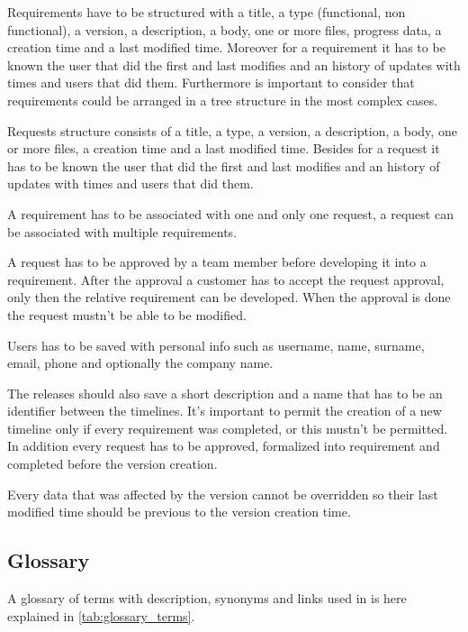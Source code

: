 \documentclass[12pt, a4paper]{report}
\begin{document}
Requirements have to be structured with a title, a type (functional, non functional), a version, a description, a body, one or
more files, progress data, a creation time and a last modified time. Moreover for a requirement it has to be known
the user that did the first and last modifies and an history of updates with times and users that did them. Furthermore is
important to consider that requirements could be arranged in a tree structure in the most complex cases.

Requests structure consists of a title, a type, a version, a description, a body, one or more files, a creation time and a last
modified time. Besides for a request it has to be known the user that did the first and last modifies and an history of
updates with times and users that did them.

A requirement has to be associated with one and only one request, a request can be associated with multiple requirements.

A request has to be approved by a team member before developing it into a requirement. After the approval a customer has to
accept the request approval, only then the relative requirement can be developed. When the approval is done the request mustn't
be able to be modified.

Users has to be saved with personal info such as username, name, surname, email, phone and optionally the company name.

The releases should also save a short description and a name that has to be an identifier between the timelines. It's important to
permit the creation of a new timeline only if every requirement was completed, or this mustn't be permitted. In addition every
request has to be approved, formalized into requirement and completed before the version creation.

Every data that was affected by the version cannot be overridden so their last modified time should be previous to the version
creation time.


\subsection*{Glossary}

A glossary of terms with description, synonyms and links used in  is here explained in
\autoref{tab:glossary_terms}.
\end{document}
